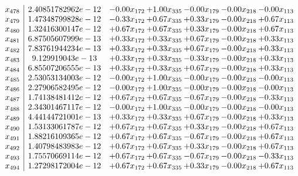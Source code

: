 \documentclass[8pt]{article}
\begin{document}
\[\begin{array}{c| c c@{\hskip 2pt} c@{\hskip 2pt} c@{\hskip 2pt} c@{\hskip 2pt} c@{\hskip 2pt} }
 x_{478}   &  2.40851782962e-12 & -0.00 x_{172} & +  1.00 x_{335} & -0.00 x_{179} & -0.00 x_{218} & -0.00 x_{113}\\
 x_{479}   &  1.47348799828e-12 & -0.33 x_{172} & +  0.67 x_{335} & +  0.33 x_{179} & -0.00 x_{218} & +  0.67 x_{113}\\
 x_{480}   &  1.32416300147e-12 & +  0.67 x_{172} & +  0.67 x_{335} & +  0.33 x_{179} & -0.00 x_{218} & +  0.67 x_{113}\\
 x_{481}   &  6.87505607999e-13 & +  0.33 x_{172} & +  0.33 x_{335} & +  0.67 x_{179} & -0.00 x_{218} & +  0.33 x_{113}\\
 x_{482}   &  7.83761944234e-13 & +  0.33 x_{172} & +  0.33 x_{335} & +  0.67 x_{179} & -0.00 x_{218} & +  0.33 x_{113}\\
 x_{483}   &  9.129919043e-13 & +  0.33 x_{172} & +  0.33 x_{335} & -0.33 x_{179} & -0.00 x_{218} & +  0.33 x_{113}\\
 x_{484}   &  6.85507206555e-13 & +  0.33 x_{172} & +  0.33 x_{335} & +  0.67 x_{179} & -0.00 x_{218} & +  0.33 x_{113}\\
 x_{485}   &  2.53053134003e-12 & -0.00 x_{172} & +  1.00 x_{335} & -0.00 x_{179} & -0.00 x_{218} & -0.00 x_{113}\\
 x_{486}   &  2.27906582495e-12 & -0.00 x_{172} & +  1.00 x_{335} & -0.00 x_{179} & -0.00 x_{218} & -0.00 x_{113}\\
 x_{487}   &  1.74138481412e-12 & +  0.67 x_{172} & +  0.67 x_{335} & -0.67 x_{179} & -0.00 x_{218} & -0.33 x_{113}\\
 x_{488}   &  2.34301467117e-12 & -0.00 x_{172} & +  1.00 x_{335} & -0.00 x_{179} & -0.00 x_{218} & -0.00 x_{113}\\
 x_{489}   &  4.44144721001e-13 & +  0.33 x_{172} & +  0.33 x_{335} & +  0.67 x_{179} & -0.00 x_{218} & +  0.33 x_{113}\\
 x_{490}   &  1.53133061787e-12 & +  0.67 x_{172} & +  0.67 x_{335} & +  0.33 x_{179} & -0.00 x_{218} & +  0.67 x_{113}\\
 x_{491}   &  1.88216109365e-12 & +  0.67 x_{172} & +  0.67 x_{335} & -0.67 x_{179} & -0.00 x_{218} & +  0.67 x_{113}\\
 x_{492}   &  1.40798483983e-12 & +  0.67 x_{172} & +  0.67 x_{335} & +  0.33 x_{179} & -0.00 x_{218} & +  0.67 x_{113}\\
 x_{493}   &  1.75570669114e-12 & +  0.67 x_{172} & +  0.67 x_{335} & -0.67 x_{179} & -0.00 x_{218} & -0.33 x_{113}\\
 x_{494}   &  1.27298172004e-12 & +  0.67 x_{172} & +  0.67 x_{335} & +  0.33 x_{179} & -0.00 x_{218} & +  0.67 x_{113}\\

\end{array}\]
\end{document}
